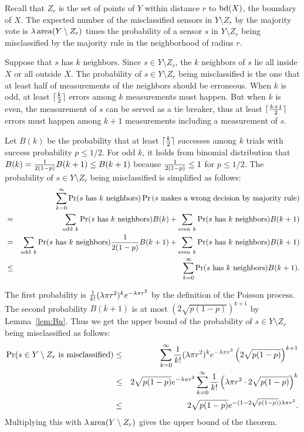 \documentclass{article}
\def\Pr{\mathop{\rm Pr}}
\def\area{\mathop{\rm area}}
\def\bd{\mathop{\rm bd}}
\begin{document}
Recall that $Z_r$ is the set of points of $Y$ within distance $r$ to $\bd(X)$, the boundary of $X$. The expected number of the misclassified sensors in $Y \setminus Z_r$ by the majority vote is \( \lambda \area(Y \setminus Z_r) \) times the probability of a sensor $s$ in $Y\setminus Z_r$ being  misclassified by the majority rule in the neighborhood of radius $r$.

Suppose that $s$ has $k$ neighbors. Since $s \in Y\setminus Z_r$, the $k$ neighbors of $s$ lie all inside $X$ or all outside $X$. The probability of $s \in Y\setminus Z_r$ being misclassified is the one that at least half of measurements of the neighbors should be erroneous. When $k$ is odd, at least $\lceil{k\over 2}\rceil$ errors among $k$ measurements must happen. But when $k$ is even, the measurement of $s$ can be served as a tie breaker, thus at least $\lceil{k+1\over 2}\rceil$ errors must happen among $k+1$ measurements including a measurement of $s$.

Let $B(k)$ be the probability that at least $\lceil{k\over 2}\rceil$ successes among $k$ trials with success probability $p\leq 1/2$. For odd $k$, it holds from binomial distribution that $B(k)= {1\over 2(1-p)}B(k+1)\leq B(k+1)$ because ${1\over 2(1-p)}\leq 1$ for $p\leq 1/2$. The probability of $s \in Y\setminus Z_r$ being misclassified is simplified as follows:
\begin{eqnarray*}\label{eq:interior0}
 & & \sum_{k=0}^{\infty} \Pr(\hbox{$s$ has $k$ neighbors})\Pr\left({\hbox{$s$ makes a wrong decision by majority rule}}\right)\nonumber\\
 & = & \sum_{\mathrm{odd~} k} \Pr(\hbox{$s$ has $k$ neighbors}) B(k) +
       \sum_{\mathrm{even~} k} \Pr(\hbox{$s$ has $k$ neighbors}) B(k+1) \\
 & = &  \sum_{\mathrm{odd~} k} \Pr(\hbox{$s$ has $k$ neighbors}){1\over 2(1-p)}B(k+1)
        +  \sum_{\mathrm{even~} k} \Pr(\hbox{$s$ has $k$ neighbors}) B(k+1) \\
 &\leq& \sum_{k=0}^{\infty} \Pr(\hbox{$s$ has $k$ neighbors}) B(k+1).
\end{eqnarray*}

The first probability is \({1\over k!}(\lambda\pi r^2)^k e^{-\lambda\pi r^2}\) by the definition of the Poisson process. The second probability $B(k+1)$ is at most $\left(2\sqrt{p(1-p)}\right)^{k+1}$ by Lemma~\ref{lem:Bn}. Thus we get the upper bound of the probability of $s \in Y\setminus Z_r$ being misclassified as follows:
\begin{eqnarray*}
\Pr(\hbox{$s \in Y\setminus Z_r$ is misclassified})&\leq&
\sum_{k=0}^\infty {1\over k!}(\lambda\pi r^2)^k e^{-\lambda\pi r^2}
\left( 2\sqrt{p(1-p)}\right)^{k+1} \nonumber \\
&\leq& 2\sqrt{p(1-p)} e^{-\lambda\pi r^2} \sum_{k=0}^\infty {1\over k!}\left(\lambda\pi r^2 \cdot 2\sqrt{p(1-p)}\right)^k \label{eq:interior1}\\
&\leq& 2\sqrt{p(1-p)} e^{-(1-2\sqrt{p(1-p)})\lambda\pi r^2}.
\end{eqnarray*}
Multiplying this with $\lambda\area(Y\setminus Z_r)$ gives the upper bound of the theorem.
\end{document}
